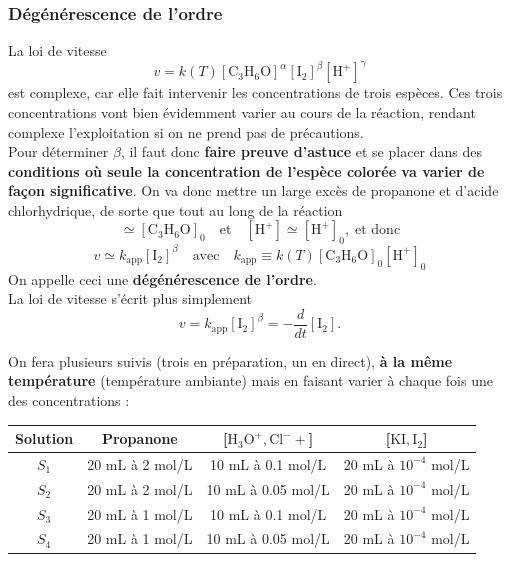 \documentclass[11pt,a4paper]{report}
\begin{document}
\subsubsection{Dégénérescence de l'ordre} 
 
La loi de vitesse 
\begin{equation}
	v = k(T)[\text{C}_3\text{H}_6\text{O}]^\alpha [\text{I}_2]^\beta [\text{H}^+]^\gamma
\end{equation}
est complexe, car elle fait intervenir les concentrations de trois espèces. Ces trois concentrations vont bien évidemment varier au cours de la réaction, rendant complexe l'exploitation si on ne prend pas de précautions.\\ 

Pour déterminer $\beta$, il faut donc \textbf{faire preuve d'astuce} et se placer dans des \textbf{conditions où seule la concentration de l'espèce colorée va varier de façon significative}. On va donc mettre un large excès de propanone et d'acide chlorhydrique, de sorte que tout au long de la réaction
\begin{equation}
	[\text{C}_3\text{H}_6\text{O}] \simeq [\text{C}_3\text{H}_6\text{O}]_0 \quad\text{et}\quad 
	[\text{H}^+] \simeq [\text{H}^+]_0,\;\text{et donc}
\end{equation}
\begin{equation}
	\boxed{v \simeq k_\text{app} [\text{I}_2]^\beta} \quad\text{avec}\quad 
	\boxed{k_\text{app} \equiv k(T)[\text{C}_3\text{H}_6\text{O}]_0 [\text{H}^+]_0}
\end{equation}
On appelle ceci une \textbf{dégénérescence de l'ordre}.\\

La loi de vitesse s'écrit plus simplement
\begin{equation}
	v = k_\text{app}[\text{I}_2]^\beta = -\frac{d}{dt}[\text{I}_2].
\end{equation}

On fera plusieurs suivis (trois en préparation, un en direct), \textbf{à la même température} (température ambiante) mais en faisant varier à chaque fois une des concentrations :
\begin{center}
	\begin{tabular}{|c|c|c|c|}
	 \hline
	 \textbf{Solution} & \textbf{Propanone} & [$\text{H}_3\text{O}^+,\text{Cl}^-+$]
	 				& [$\text{KI},\text{I}_2$] \\
	 \hline
	 $S_1$ & 20 mL à 2 mol/L & 10 mL à 0.1 mol/L & 20 mL à $10^{-4}$ mol/L\\
	 $S_2$ & 20 mL à 2 mol/L & 10 mL à 0.05 mol/L & 20 mL à $10^{-4}$ mol/L\\
	 $S_3$ & 20 mL à 1 mol/L & 10 mL à 0.1 mol/L & 20 mL à $10^{-4}$ mol/L\\
	 $S_4$ & 20 mL à 1 mol/L & 10 mL à 0.05 mol/L & 20 mL à $10^{-4}$ mol/L\\
	 \hline
	\end{tabular}
\end{center}
\end{document}

